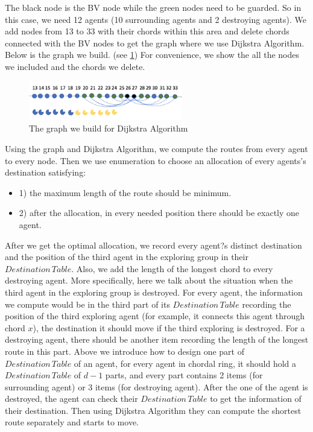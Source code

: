 The black node is the BV node while the green nodes need to be guarded. So in this case, we need 12 agents (10 surrounding agents and 2 destroying agents). 
We add nodes from 13 to 33 with their chords within this area and delete chords connected with the BV nodes to get the graph where we use Dijkstra Algorithm. Below is the graph we build. (see \ref{fig:D2}) For convenience, we show the all the nodes we included and the chords we delete.
\begin{figure}[H]
  \centering  
  \includegraphics[width=0.6\textwidth]{figures/D2.png}
  \caption{The graph we build for Dijkstra Algorithm}\label{fig:D2}
\end{figure} 
Using the graph and Dijkstra Algorithm, we compute the routes from every agent to every node. Then we use enumeration to choose an allocation of every agents's destination satisfying: 
\begin{itemize}
\item 1) the maximum length of the route should be minimum. 
\item 2) after the allocation, in every needed position there should be exactly one agent.
\end{itemize}
After we get the optimal allocation, we record every agent?s distinct destination and the position of the third agent in the exploring group in their $Destination\,Table$. Also, we add the length of the longest chord to every destroying agent.
More specifically, here we talk about the situation when the third agent in the exploring group is destroyed. For every agent, the information we compute would be in the third part of its $Destination\,Table$ recording the position of the third exploring agent (for example, it connects this agent through chord $x$), the destination it should move if the third exploring is destroyed. For a destroying agent, there should be another item recording the length of the longest route in this part.
Above we introduce how to design one part of $Destination\,Table$ of an agent, for every agent in chordal ring, it should hold a $Destination\,Table$ of $d-1$ parts, and every part contains 2 items (for surrounding agent) or 3 items (for destroying agent).
After the one of the agent is destroyed, the agent can check their $Destination\,Table$ to get the information of their destination. Then using Dijkstra Algorithm they can compute the shortest route separately and starts to move.

